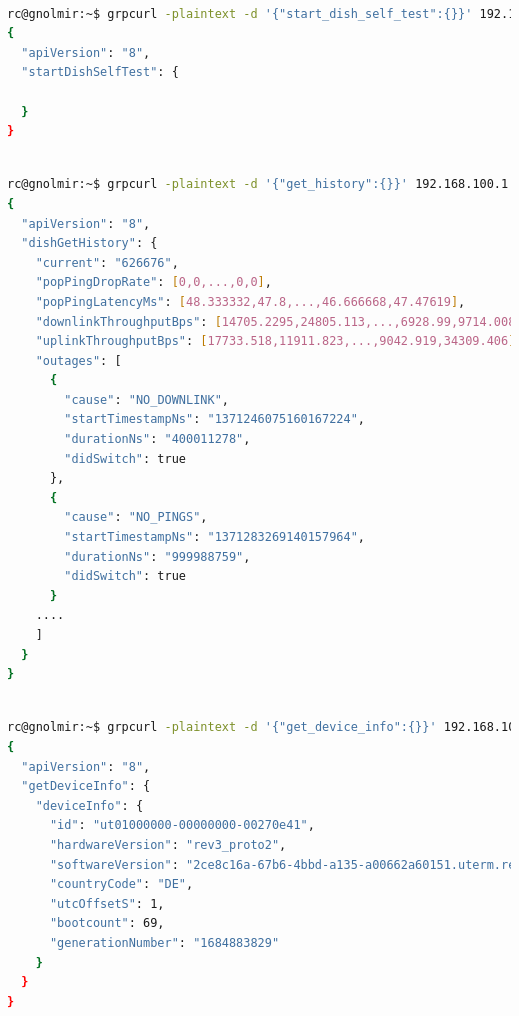 \documentclass[IN,11pt,twoside,openright,bachelor,english]{tumthesis}
\begin{document}
\begin{lstlisting}[language=bash,basicstyle=\tiny]

rc@gnolmir:~$ grpcurl -plaintext -d '{"start_dish_self_test":{}}' 192.168.100.1:9200 SpaceX.API.Device.Device/Handle
{
  "apiVersion": "8",
  "startDishSelfTest": {
    
  }
}
\end{lstlisting}
\begin{lstlisting}[language=bash,basicstyle=\tiny]

rc@gnolmir:~$ grpcurl -plaintext -d '{"get_history":{}}' 192.168.100.1:9200 SpaceX.API.Device.Device/Handle
{
  "apiVersion": "8",
  "dishGetHistory": {
    "current": "626676",
    "popPingDropRate": [0,0,...,0,0],
    "popPingLatencyMs": [48.333332,47.8,...,46.666668,47.47619],
    "downlinkThroughputBps": [14705.2295,24805.113,...,6928.99,9714.008],
    "uplinkThroughputBps": [17733.518,11911.823,...,9042.919,34309.406],
    "outages": [
      {
        "cause": "NO_DOWNLINK",
        "startTimestampNs": "1371246075160167224",
        "durationNs": "400011278",
        "didSwitch": true
      },
      {
        "cause": "NO_PINGS",
        "startTimestampNs": "1371283269140157964",
        "durationNs": "999988759",
        "didSwitch": true
      }
    ....
    ]
  }
}
\end{lstlisting}
\begin{lstlisting}[language=bash,basicstyle=\tiny]

rc@gnolmir:~$ grpcurl -plaintext -d '{"get_device_info":{}}' 192.168.100.1:9200 SpaceX.API.Device.Device/Handle
{
  "apiVersion": "8",
  "getDeviceInfo": {
    "deviceInfo": {
      "id": "ut01000000-00000000-00270e41",
      "hardwareVersion": "rev3_proto2",
      "softwareVersion": "2ce8c16a-67b6-4bbd-a135-a00662a60151.uterm.release",
      "countryCode": "DE",
      "utcOffsetS": 1,
      "bootcount": 69,
      "generationNumber": "1684883829"
    }
  }
}
\end{lstlisting}
\end{document}

